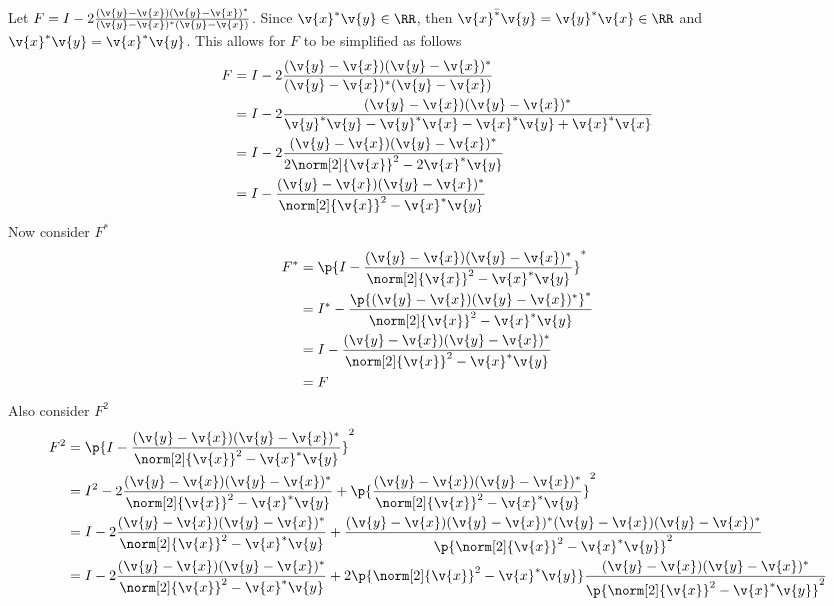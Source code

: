 \documentclass[11pt]{article}
\begin{document}
\begin{enumerate}
\begin{enumerate}
                Let $F = I - 2 \frac{(\v{y} - \v{x})(\v{y} - \v{x})^*}{(\v{y} - \v{x})^*(\v{y} - \v{x})}$.
                Since $\v{x}^* \v{y} \in \RR$, then
                $\bar{\v{x}^* \v{y}} = \v{y}^* \v{x} \in \RR$ and
                $\v{x}^* \v{y} = \v{x}^* \v{y}$.
                This allows for $F$ to be simplified as follows
                \begin{align*}
                    F &= I - 2 \frac{(\v{y} - \v{x})(\v{y} - \v{x})^*}{(\v{y} - \v{x})^*(\v{y} - \v{x})} \\
                      &= I - 2 \frac{(\v{y} - \v{x})(\v{y} - \v{x})^*}{\v{y}^*\v{y} - \v{y}^*\v{x} - \v{x}^*\v{y} + \v{x}^*\v{x}} \\
                      &= I - 2 \frac{(\v{y} - \v{x})(\v{y} - \v{x})^*}{2\norm[2]{\v{x}}^2 - 2\v{x}^*\v{y}} \\
                      &= I - \frac{(\v{y} - \v{x})(\v{y} - \v{x})^*}{\norm[2]{\v{x}}^2 - \v{x}^*\v{y}} \\
                \end{align*}
                Now consider $F^*$
                \begin{align*}
                    F^* &= \p{I - \frac{(\v{y} - \v{x})(\v{y} - \v{x})^*}{\norm[2]{\v{x}}^2 - \v{x}^*\v{y}}}^* \\
                        &= I^* - \frac{\p{(\v{y} - \v{x})(\v{y} - \v{x})^*}^*}{\norm[2]{\v{x}}^2 - \v{x}^*\v{y}} \\
                        &= I - \frac{(\v{y} - \v{x})(\v{y} - \v{x})^*}{\norm[2]{\v{x}}^2 - \v{x}^*\v{y}} \\
                        &= F
                \end{align*}
                Also consider $F^2$
                \begin{align*}
                    F^2 &= \p{I - \frac{(\v{y} - \v{x})(\v{y} - \v{x})^*}{\norm[2]{\v{x}}^2 - \v{x}^*\v{y}}}^2 \\
                        &= I^2 - 2\frac{(\v{y} - \v{x})(\v{y} - \v{x})^*}{\norm[2]{\v{x}}^2 - \v{x}^*\v{y}} + \p{\frac{(\v{y} - \v{x})(\v{y} - \v{x})^*}{\norm[2]{\v{x}}^2 - \v{x}^*\v{y}}}^2 \\
                        &= I - 2\frac{(\v{y} - \v{x})(\v{y} - \v{x})^*}{\norm[2]{\v{x}}^2 - \v{x}^*\v{y}} + \frac{(\v{y} - \v{x})(\v{y} - \v{x})^*(\v{y} - \v{x})(\v{y} - \v{x})^*}{\p{\norm[2]{\v{x}}^2 - \v{x}^*\v{y}}^2} \\
                        &= I - 2\frac{(\v{y} - \v{x})(\v{y} - \v{x})^*}{\norm[2]{\v{x}}^2 - \v{x}^*\v{y}} + 2\p{\norm[2]{\v{x}}^2 - \v{x}^*\v{y}}\frac{(\v{y} - \v{x})(\v{y} - \v{x})^*}{\p{\norm[2]{\v{x}}^2 - \v{x}^*\v{y}}^2} \\

\end{align*}
\end{enumerate}
\end{enumerate}
\end{document}
